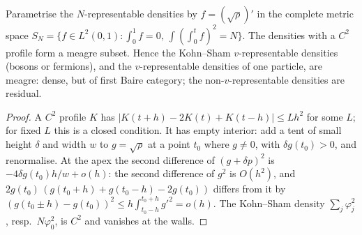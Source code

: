 \begin{theorem}
  \label{thm:line_meagre}
  \leanok
  Parametrise the $N$-representable densities by $f=(\sqrt\rho)'$ in the complete metric space
  $S_N=\{f\in L^2(0,1):\int_0^1f=0,\ \int(\int_0^tf)^2=N\}$. The densities with a $C^2$ profile form a meagre subset.
  Hence the Kohn--Sham $v$-representable densities (bosons or fermions), and the $v$-representable densities of one
  particle, are meagre: dense, but of first Baire category; the non-$v$-representable densities are residual.
\end{theorem}
\begin{proof}
  \leanok
  A $C^2$ profile $K$ has $|K(t+h)-2K(t)+K(t-h)|\le Lh^2$ for some $L$; for fixed $L$ this is a closed condition. It has
  empty interior: add a tent of small height $\delta$ and width $w$ to $g=\sqrt\rho$ at a point $t_0$ where $g\ne0$,
  with $\delta g(t_0)>0$, and renormalise. At the apex the second difference of $(g+\delta p)^2$ is
  $-4\delta g(t_0)h/w+o(h)$: the second difference of $g^2$ is $O(h^2)$, and
  $2g(t_0)\,(g(t_0+h)+g(t_0-h)-2g(t_0))$ differs from it by $(g(t_0\pm h)-g(t_0))^2\le h\int_{t_0-h}^{t_0+h}g'^2=o(h)$.
  The Kohn--Sham density $\sum_j\varphi_j^2$, resp.\ $N\varphi_0^2$, is $C^2$ and vanishes at the walls.
\end{proof}

